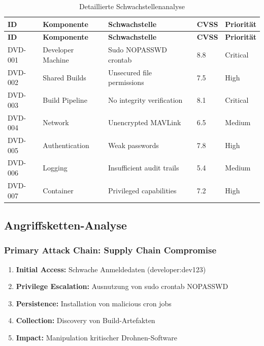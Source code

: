 \documentclass[11pt,a4paper]{article}
\begin{document}
\begin{longtable}{|l|l|p{3cm}|l|l|}
\caption{Detaillierte Schwachstellenanalyse} \\
\hline
\textbf{ID} & \textbf{Komponente} & \textbf{Schwachstelle} & \textbf{CVSS} & \textbf{Priorität} \\
\hline
\endfirsthead
\hline
\textbf{ID} & \textbf{Komponente} & \textbf{Schwachstelle} & \textbf{CVSS} & \textbf{Priorität} \\
\hline
\endhead
\hline
\endfoot
\hline
\endlastfoot

DVD-001 & Developer Machine & Sudo NOPASSWD crontab & 8.8 & Critical \\
\hline
DVD-002 & Shared Builds & Unsecured file permissions & 7.5 & High \\
\hline
DVD-003 & Build Pipeline & No integrity verification & 8.1 & Critical \\
\hline
DVD-004 & Network & Unencrypted MAVLink & 6.5 & Medium \\
\hline
DVD-005 & Authentication & Weak passwords & 7.8 & High \\
\hline
DVD-006 & Logging & Insufficient audit trails & 5.4 & Medium \\
\hline
DVD-007 & Container & Privileged capabilities & 7.2 & High \\
\hline
\end{longtable}

\subsection{Angriffsketten-Analyse}

\subsubsection{Primary Attack Chain: Supply Chain Compromise}

\begin{enumerate}[leftmargin=*]
    \item \textbf{Initial Access:} Schwache Anmeldedaten (developer:dev123)
    \item \textbf{Privilege Escalation:} Ausnutzung von sudo crontab NOPASSWD
    \item \textbf{Persistence:} Installation von malicious cron jobs
    \item \textbf{Collection:} Discovery von Build-Artefakten
    \item \textbf{Impact:} Manipulation kritischer Drohnen-Software
\end{enumerate}
\end{document}
